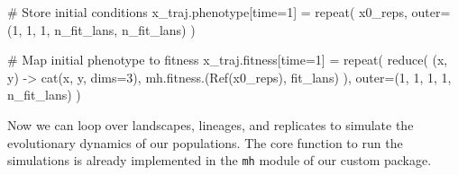 \documentclass[
]{scrartcl}
\newenvironment{Shaded}{\begin{snugshade}}{\end{snugshade}}
\newcommand{\CommentTok}[1]{\textcolor[rgb]{0.37,0.37,0.37}{#1}}
\newcommand{\FloatTok}[1]{\textcolor[rgb]{0.68,0.00,0.00}{#1}}
\newcommand{\FunctionTok}[1]{\textcolor[rgb]{0.28,0.35,0.67}{#1}}
\newcommand{\NormalTok}[1]{\textcolor[rgb]{0.00,0.23,0.31}{#1}}
\newcommand{\OperatorTok}[1]{\textcolor[rgb]{0.37,0.37,0.37}{#1}}
\begin{document}
\begin{Shaded}
\begin{Highlighting}[]
\CommentTok{\# Store initial conditions}
\NormalTok{x\_traj.phenotype[time}\OperatorTok{=}\FloatTok{1}\NormalTok{] }\OperatorTok{=} \FunctionTok{repeat}\NormalTok{(}
\NormalTok{    x0\_reps,}
\NormalTok{    outer}\OperatorTok{=}\NormalTok{(}\FloatTok{1}\NormalTok{, }\FloatTok{1}\NormalTok{, }\FloatTok{1}\NormalTok{, n\_fit\_lans, n\_fit\_lans)}
\NormalTok{)}

\CommentTok{\# Map initial phenotype to fitness}
\NormalTok{x\_traj.fitness[time}\OperatorTok{=}\FloatTok{1}\NormalTok{] }\OperatorTok{=} \FunctionTok{repeat}\NormalTok{(}
    \FunctionTok{reduce}\NormalTok{(}
\NormalTok{        (x, y) }\OperatorTok{{-}\textgreater{}} \FunctionTok{cat}\NormalTok{(x, y, dims}\OperatorTok{=}\FloatTok{3}\NormalTok{),}
\NormalTok{        mh.}\FunctionTok{fitness}\NormalTok{.(}\FunctionTok{Ref}\NormalTok{(x0\_reps), fit\_lans)}
\NormalTok{    ),}
\NormalTok{    outer}\OperatorTok{=}\NormalTok{(}\FloatTok{1}\NormalTok{, }\FloatTok{1}\NormalTok{, }\FloatTok{1}\NormalTok{, }\FloatTok{1}\NormalTok{, n\_fit\_lans)}
\NormalTok{)}
\end{Highlighting}
\end{Shaded}

Now we can loop over landscapes, lineages, and replicates to simulate
the evolutionary dynamics of our populations. The core function to run
the simulations is already implemented in the \texttt{mh} module of our
custom package.
\end{document}
